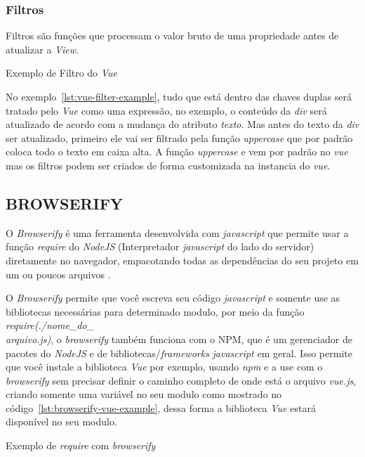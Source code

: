 \subsubsection{Filtros}
Filtros são funções que processam o valor bruto de uma propriedade antes de atualizar a \textit{View}.
    \begin{listing}[H]
        \caption{Exemplo de Filtro do \textit{Vue}}
        \label{lst:vue-filter-example}
    \end{listing}
    No exemplo~\ref{lst:vue-filter-example}, tudo que está dentro das chaves duplas será tratado pelo \textit{Vue} como uma expressão, no exemplo, o conteúdo da \textit{div} será atualizado de acordo com a mudança do atributo \textit{texto}. Mas antes do texto da \textit{div} ser atualizado, primeiro ele vai ser filtrado pela função \textit{uppercase} que por padrão coloca todo o texto em caixa alta. A função \textit{uppercase} e vem por padrão no \textit{vue} mas os filtros podem ser criados de forma customizada na instancia do \textit{vue}.

\subsection{BROWSERIFY}
\label{sec:browserify}

O \textit{Browserify} é uma ferramenta desenvolvida com \textit{javascript} que permite usar a função \textit{require} do \textit{NodeJS} (Interpretador \textit{javascript} do lado do servidor) diretamente no navegador, empacotando todas as dependências do seu projeto em um ou poucos arquivos \cite{browserify}.

O \textit{Browserify} permite que você escreva seu código \textit{javascript} e somente use as bibliotecas necessárias para determinado modulo, por meio da função \textit{require(./nome\_do\_\\arquivo.js)}, o \textit{browserify} também funciona com o \ac{NPM}, que é um gerenciador de pacotes do \textit{NodeJS} e de bibliotecas/\textit{frameworks} \textit{javascript} em geral. Isso permite que você instale a biblioteca \textit{Vue} por exemplo, usando \textit{npm} e a use com o \textit{browserify} sem precisar definir o caminho completo de onde está o arquivo \textit{vue.js}, criando somente uma variável no seu modulo como mostrado no código~\ref{lst:browserify-vue-example}, dessa forma a biblioteca \textit{Vue} estará disponível no seu modulo.

\begin{listing}[H]
    \caption{Exemplo de \textit{require} com \textit{browserify}}
    \label{lst:browserify-vue-example}
\end{listing}

